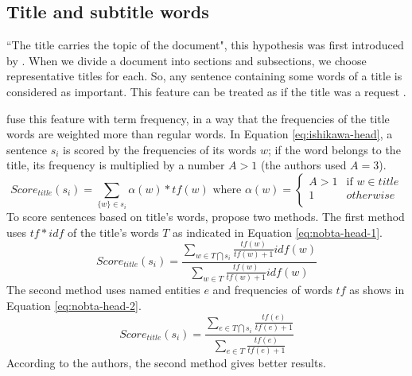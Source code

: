 \subsection{Title and subtitle words}

``The title carries the topic of the document", this hypothesis was first introduced by \citet{69-edmundson}.
When we divide a document into sections and subsections, we choose representative titles for each. 
So, any sentence containing some words of a title is considered as important.
This feature can be treated as if the title was a request \citep{88-salton-buckley}. 

\citet{01-ishikawa-al} fuse this feature with term frequency, in a way that the frequencies of the title words are weighted more than regular words.
In Equation \ref{eq:ishikawa-head}, a sentence $ s_i $ is scored by the frequencies of its words $ w $; if the word belongs to the title, its frequency is multiplied by a number $ A > 1 $ (the authors used $ A = 3 $).
\begin{equation}
	\label{eq:ishikawa-head}
	Score_{title}(s_i) = \sum_{\{w\} \in s_i}{\alpha(w) * tf(w)} 
	\text{ where }
	\alpha(w) = \left\lbrace 
	\begin{array}{ll}
		A > 1 & \text{if } w \in title \\
		1 & otherwise \\
	\end{array} 
	\right. 
\end{equation}
To score sentences based on title's words, \citet{04-nobata-sekine} propose two methods.
The first method uses $ tf*idf $ of the title's words $ T $ as indicated in Equation \ref{eq:nobta-head-1}.
\begin{equation}
\label{eq:nobta-head-1}
Score_{title}(s_i) = \frac{\sum_{w \in T \bigcap s_i}{\frac{tf(w)}{tf(w)+1} idf(w)}}
{\sum_{w \in T}{\frac{tf(w)}{tf(w)+1} idf(w)}}
\end{equation}
The second method uses named entities $ e $ and frequencies of words $ tf $ as shows in Equation \ref{eq:nobta-head-2}.
\begin{equation}
\label{eq:nobta-head-2}
Score_{title}(s_i) = \frac{\sum_{e \in T \bigcap s_i}{\frac{tf(e)}{tf(e)+1}}}
{\sum_{e \in T}{\frac{tf(e)}{tf(e)+1}}}
\end{equation}
According to the authors, the second method gives better results.

